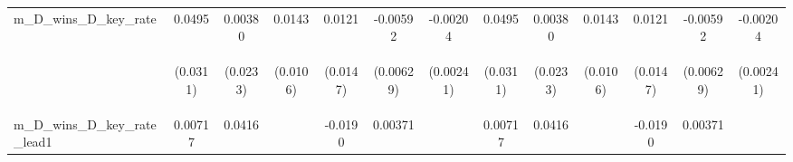 \documentclass[]{article}
\begin{document}
\begin{center}
\begin{tabular}{lcccccccccccc}
m\_D\_wins\_D\_key\_rate & 0.0495 & 0.00380 & 0.0143 & 0.0121 & -0.00592 & -0.00204 & 0.0495 & 0.00380 & 0.0143 & 0.0121 & -0.00592 & -0.00204 \\
\vspace{4pt} & \begin{footnotesize}(0.0311)\end{footnotesize} & \begin{footnotesize}(0.0233)\end{footnotesize} & \begin{footnotesize}(0.0106)\end{footnotesize} & \begin{footnotesize}(0.0147)\end{footnotesize} & \begin{footnotesize}(0.00629)\end{footnotesize} & \begin{footnotesize}(0.00241)\end{footnotesize} & \begin{footnotesize}(0.0311)\end{footnotesize} & \begin{footnotesize}(0.0233)\end{footnotesize} & \begin{footnotesize}(0.0106)\end{footnotesize} & \begin{footnotesize}(0.0147)\end{footnotesize} & \begin{footnotesize}(0.00629)\end{footnotesize} & \begin{footnotesize}(0.00241)\end{footnotesize} \\
m\_D\_wins\_D\_key\_rate\_lead1 & 0.00717 & 0.0416 &  & -0.0190 & 0.00371 &  & 0.00717 & 0.0416 &  & -0.0190 & 0.00371 &  \\

\end{tabular}
\end{center}
\end{document}
